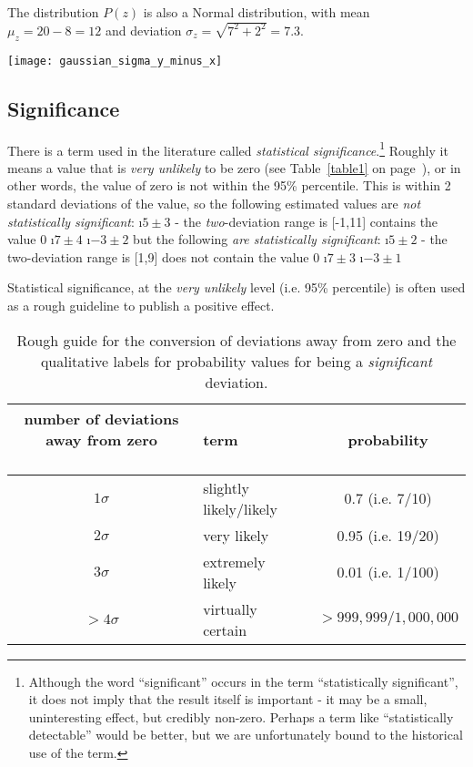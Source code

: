 The distribution $P(z)$ is also a Normal distribution, with mean $\mu_{z}=20-8 = 12$ and deviation $\sigma_{z}=\sqrt{7^{2}+2^{2}}=7.3$.

\texttt{[image: gaussian\_sigma\_y\_minus\_x]}


\subsection{Significance}

There is a term used in the literature called {\em statistical significance}.\footnote{Although the word ``significant'' occurs in the term ``statistically significant'', it does not imply that the result itself is important - it may be a small, uninteresting effect, but credibly non-zero.  Perhaps a term like ``statistically detectable'' would be better, but we are unfortunately bound to the historical use of the term.}  Roughly it means a value that is \emph{very unlikely} to be zero (see Table~\ref{table1} on page~\pageref{table1}), or in other words, the value of zero is not within the 95\% percentile.  This is within 2 standard deviations of the value, so the following estimated values are {\em not statistically significant}:
\bi
\i $5\pm 3$ - the \emph{two}-deviation range is [-1,11] contains the value 0
\i $7\pm 4$
\i $-3 \pm 2$
\ei
but the following {\em are statistically significant}:
\bi
\i $5\pm 2$  - the two-deviation range is [1,9] does not contain the value 0
\i $7\pm 3$
\i $-3 \pm 1$
\ei

Statistical significance, at the \emph{very unlikely} level (i.e. 95\% percentile) is often used as a rough guideline to publish a positive effect.  
\begin{table}
\begin{tabular}{cp{1.3in}c}
\parbox{1in}{number of deviations away from zero\\ \ }& term & probability \\\hline\hline
$1\sigma$ & slightly likely/likely & 0.7 (i.e. 7/10) \\
$2\sigma$ & very likely & 0.95 (i.e. 19/20) \\
$3\sigma$ & extremely likely & 0.01 (i.e. 1/100) \\
$>4\sigma$ & virtually certain & $>999,999/1,000,000$
\end{tabular}
\label{tbl:norm likely}
\caption{Rough guide for the conversion of deviations away from zero and the  qualitative labels for probability values for being a \emph{significant} deviation.}
\end{table}


